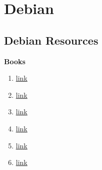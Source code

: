 \chapter{Debian}
\section{Debian Resources}
	\textbf{Books}
		\begin{enumerate}
		\item {}\href{https://www.togaware.com/linux/survivor/}{link}
		\item {}\href{http://www.wiley.com/WileyCDA/WileyTitle/productCd-0764595326.html}{link}
		\item{}\href{http://debiansystem.info/}{link}
		\item{}\href{http://dsl.org/cookbook/}{link}
		\item{}\href{http://www.oreilly.com/openbook/debian/book/index.html}{link}
		\item{}\href{https://debian-handbook.info/}{link}
		\end{enumerate}
